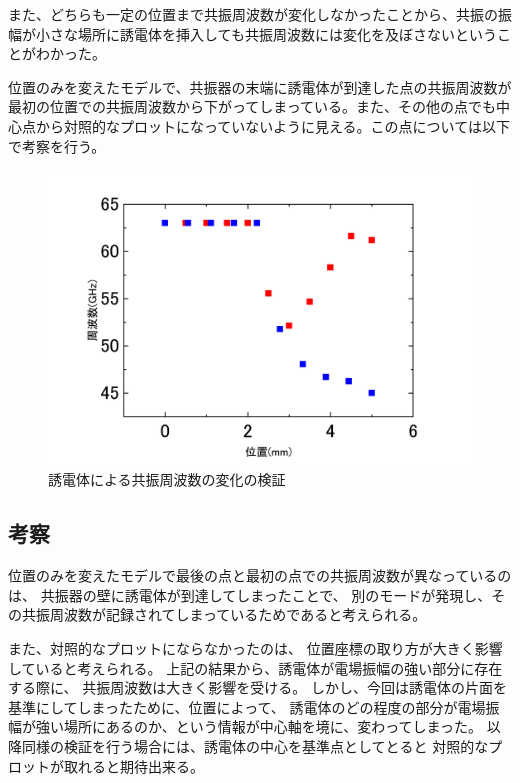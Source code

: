 また、どちらも一定の位置まで共振周波数が変化しなかったことから、共振の振幅が小さな場所に誘電体を挿入しても共振周波数には変化を及ぼさないということがわかった。

位置のみを変えたモデルで、共振器の末端に誘電体が到達した点の共振周波数が最初の位置での共振周波数から下がってしまっている。また、その他の点でも中心点から対照的なプロットになっていないように見える。この点については以下で考察を行う。

\vspace{10 mm}

\begin{figure}[h]
  \begin{center}
    \includegraphics[width=12cm]{./image/plot1.jpg}
    \caption{誘電体による共振周波数の変化の検証}
    \label{fig:Cavity}
  \end{center}
\end{figure}


\subsection{考察}
位置のみを変えたモデルで最後の点と最初の点での共振周波数が異なっているのは、
共振器の壁に誘電体が到達してしまったことで、
別のモードが発現し、その共振周波数が記録されてしまっているためであると考えられる。

また、対照的なプロットにならなかったのは、
位置座標の取り方が大きく影響していると考えられる。
上記の結果から、誘電体が電場振幅の強い部分に存在する際に、
共振周波数は大きく影響を受ける。
しかし、今回は誘電体の片面を基準にしてしまったために、位置によって、
誘電体のどの程度の部分が電場振幅が強い場所にあるのか、という情報が中心軸を境に、変わってしまった。
以降同様の検証を行う場合には、誘電体の中心を基準点としてとると
対照的なプロットが取れると期待出来る。



